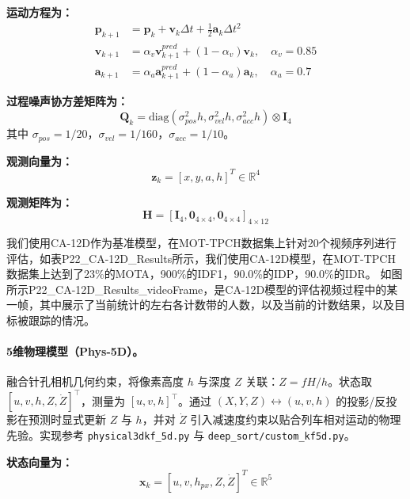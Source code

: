 \textbf{运动方程为：}
\begin{align}
\mathbf{p}_{k+1} &= \mathbf{p}_k + \mathbf{v}_k \Delta t + \frac{1}{2}\mathbf{a}_k \Delta t^2 \\
\mathbf{v}_{k+1} &= \alpha_v \mathbf{v}_{k+1}^{pred} + (1-\alpha_v) \mathbf{v}_k, \quad \alpha_v = 0.85 \\
\mathbf{a}_{k+1} &= \alpha_a \mathbf{a}_{k+1}^{pred} + (1-\alpha_a) \mathbf{a}_k, \quad \alpha_a = 0.7
\end{align}

\textbf{过程噪声协方差矩阵为：}
\begin{equation}
\mathbf{Q}_k = \text{diag}(\sigma_{pos}^2 h, \sigma_{vel}^2 h, \sigma_{acc}^2 h) \otimes \mathbf{I}_4
\end{equation}
其中 $\sigma_{pos} = 1/20$，$\sigma_{vel} = 1/160$，$\sigma_{acc} = 1/10$。

\textbf{观测向量为：}
\begin{equation}
\mathbf{z}_k = [x, y, a, h]^T \in \mathbb{R}^{4}
\end{equation}

\textbf{观测矩阵为：}
\begin{equation}
\mathbf{H} = [\mathbf{I}_4, \mathbf{0}_{4 \times 4}, \mathbf{0}_{4 \times 4}]_{4 \times 12}
\end{equation}


我们使用CA-12D作为基准模型，在MOT-TPCH数据集上针对20个视频序列进行评估，如表P22_CA-12D_Results所示，我们使用CA-12D模型，在MOT-TPCH数据集上达到了23\%的MOTA，900\%的IDF1，90.0\%的IDP，90.0\%的IDR。
如图所示P22_CA-12D_Results_videoFrame，是CA-12D模型的评估视频过程中的某一帧，其中展示了当前统计的左右各计数带的人数，以及当前的计数结果，以及目标被跟踪的情况。


\paragraph{5维物理模型（Phys-5D）。} 融合针孔相机几何约束，将像素高度 \(h\) 与深度 \(Z\) 关联：\(Z = fH/h\)。状态取 \([u, v, h, Z, \dot Z]^\top\)，测量为 \([u, v, h]^\top\)。通过 \((X,Y,Z) \leftrightarrow (u,v,h)\) 的投影/反投影在预测时显式更新 \(Z\) 与 \(h\)，并对 \(\dot Z\) 引入减速度约束以贴合列车相对运动的物理先验。实现参考 \texttt{physical3dkf\_5d.py} 与 \texttt{deep\_sort/custom\_kf5d.py}。

\textbf{状态向量为：}
\begin{equation}
\mathbf{x}_k = [u, v, h_{px}, Z, \dot{Z}]^T \in \mathbb{R}^{5}
\end{equation}

